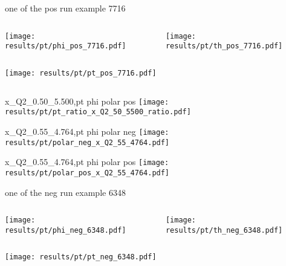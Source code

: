 \begin{frame}{one of the pos run example 7716}
\begin{columns}
\begin{column}[T]{0.5\textwidth}
\texttt{[image: results/pt/phi\_pos\_7716.pdf]}
\end{column}
\begin{column}[T]{0.5\textwidth}
\texttt{[image: results/pt/th\_pos\_7716.pdf]}
\end{column}
\end{columns}
\begin{columns}
\begin{column}[T]{0.5\textwidth}
\texttt{[image: results/pt/pt\_pos\_7716.pdf]}
\end{column}
\begin{column}[T]{0.5\textwidth}
\end{column}
\end{columns}
\end{frame}
\begin{frame}{x\_Q2\_0.50\_5.500,pt phi polar pos}
\texttt{[image: results/pt/pt\_ratio\_x\_Q2\_50\_5500\_ratio.pdf]}
\end{frame}
\begin{frame}{x\_Q2\_0.55\_4.764,pt phi polar neg}
\texttt{[image: results/pt/polar\_neg\_x\_Q2\_55\_4764.pdf]}
\end{frame}
\begin{frame}{x\_Q2\_0.55\_4.764,pt phi polar pos}
\texttt{[image: results/pt/polar\_pos\_x\_Q2\_55\_4764.pdf]}
\end{frame}
\begin{frame}{one of the neg run example 6348}
\begin{columns}
\begin{column}[T]{0.5\textwidth}
\texttt{[image: results/pt/phi\_neg\_6348.pdf]}
\end{column}
\begin{column}[T]{0.5\textwidth}
\texttt{[image: results/pt/th\_neg\_6348.pdf]}
\end{column}
\end{columns}
\texttt{[image: results/pt/pt\_neg\_6348.pdf]}
\end{frame}
